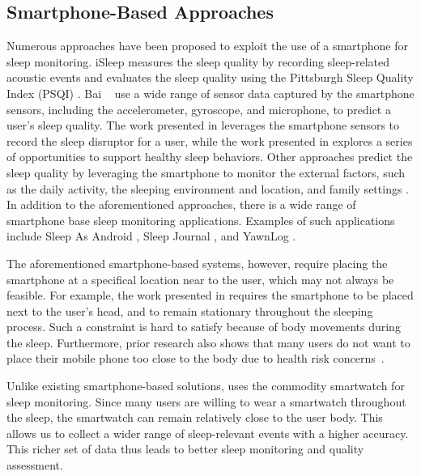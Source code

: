 \subsection{Smartphone-Based Approaches}
Numerous approaches have been proposed to exploit the use of a smartphone for sleep monitoring. iSleep \cite{hao2013isleep} measures the
sleep quality by recording sleep-related acoustic events and evaluates the sleep quality using the Pittsburgh Sleep Quality Index (PSQI)
\cite{carpenter1998psychometric}. Bai \etal~\cite{bai2012will} use a wide range of sensor data captured by the smartphone sensors,
including the accelerometer, gyroscope, and microphone, to predict a user's sleep quality. The work presented in \cite{kay2012lullaby}
leverages the smartphone sensors to record the sleep disruptor for a user, while the work presented in \cite{choe2011opportunities}
explores a series of opportunities to support healthy sleep behaviors. Other approaches predict the sleep quality by leveraging the
smartphone to monitor the external factors, such as the daily activity, the sleeping environment and location, and family settings
\cite{chen2013unobtrusive,zhang2013real}. In addition to the aforementioned approaches, there is a wide range of smartphone base sleep
monitoring applications. Examples of such applications include Sleep As Android \cite{SleepAndroid}, Sleep Journal \cite{SleepJournal}, and
YawnLog \cite{YawnLog}.

The aforementioned smartphone-based systems, however, require placing the smartphone at a specifical location near to the user, which may
not always be feasible. For example, the work presented in \cite{gu2016sleep} requires the smartphone to be placed next to the user's head,
and to remain stationary throughout the sleeping process. Such a constraint is hard to satisfy because of body movements during the sleep.
Furthermore, prior research also shows that many users do not want to place their mobile phone too close to the body due to health risk
concerns~\cite{StepHealth,Quorasleep}.

Unlike existing smartphone-based solutions, \systemname uses the commodity smartwatch for sleep monitoring. Since many users are willing to
wear a smartwatch throughout the sleep, the smartwatch can remain relatively close to the user body. This allows us to collect a wider
range of sleep-relevant events with a higher accuracy. This richer set of data thus leads to better sleep monitoring and quality
assessment.

